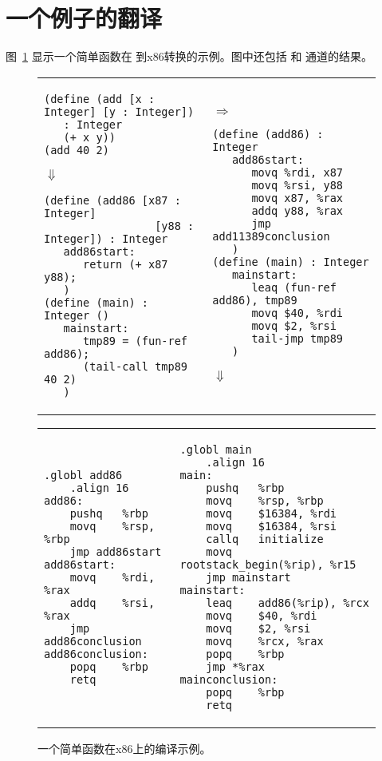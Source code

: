 \documentclass[11pt]{book}
\begin{document}
\section{一个例子的翻译}
\label{sec:functions-example}

图~\ref{fig:add-fun} 显示一个简单函数在 \LangFun{} 到x86转换的示例。图中还包括
 和  通道的结果。

\begin{figure}[htbp]
\begin{tabular}{ll}
\begin{minipage}{0.5\textwidth}
\begin{lstlisting}[basicstyle=\ttfamily\scriptsize]
(define (add [x : Integer] [y : Integer])
   : Integer
   (+ x y))
(add 40 2)
\end{lstlisting}
$\Downarrow$
\begin{lstlisting}[basicstyle=\ttfamily\scriptsize]
(define (add86 [x87 : Integer]
                 [y88 : Integer]) : Integer
   add86start:
      return (+ x87 y88);
   )
(define (main) : Integer ()
   mainstart:
      tmp89 = (fun-ref add86);
      (tail-call tmp89 40 2)
   )
\end{lstlisting}
\end{minipage}
&
$\Rightarrow$
\begin{minipage}{0.5\textwidth}
\begin{lstlisting}[basicstyle=\ttfamily\scriptsize]
(define (add86) : Integer
   add86start:
      movq %rdi, x87
      movq %rsi, y88
      movq x87, %rax
      addq y88, %rax
      jmp add11389conclusion
   )
(define (main) : Integer
   mainstart:
      leaq (fun-ref add86), tmp89
      movq $40, %rdi
      movq $2, %rsi
      tail-jmp tmp89
   )
\end{lstlisting}
$\Downarrow$
\end{minipage}
\end{tabular}
\begin{tabular}{ll}
\begin{minipage}{0.3\textwidth}
\begin{lstlisting}[basicstyle=\ttfamily\scriptsize]
	.globl add86
	.align 16
add86:
	pushq	%rbp
	movq	%rsp, %rbp
	jmp	add86start
add86start:
	movq	%rdi, %rax
	addq	%rsi, %rax
	jmp add86conclusion
add86conclusion:
	popq	%rbp
	retq
\end{lstlisting}
\end{minipage}
&
\begin{minipage}{0.5\textwidth}
\begin{lstlisting}[basicstyle=\ttfamily\scriptsize]
	.globl main
	.align 16
main:
	pushq	%rbp
	movq	%rsp, %rbp
	movq	$16384, %rdi
	movq	$16384, %rsi
	callq	initialize
	movq	rootstack_begin(%rip), %r15
	jmp	mainstart
mainstart:
	leaq	add86(%rip), %rcx
	movq	$40, %rdi
	movq	$2, %rsi
	movq	%rcx, %rax
	popq	%rbp
	jmp	*%rax
mainconclusion:
	popq	%rbp
	retq
\end{lstlisting}
\end{minipage}
\end{tabular}
\caption{一个简单函数在x86上的编译示例。}
\label{fig:add-fun}
\end{figure}
\end{document}
